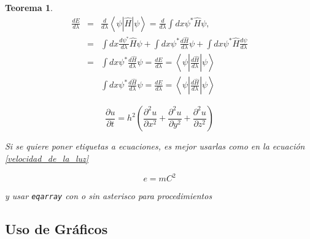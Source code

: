 \documentclass[a4paper]{IEEEtran} %
\newtheorem{teor}{Teorema}[section] %
\begin{document}
\begin{teor}
\begin{eqnarray*}
\frac{dE}{d \lambda}    & = & \frac{d}{d \lambda} \left\langle \psi | \widehat{H} | \psi \right\rangle = \frac{d}{d \lambda} \int dx \psi^* \widehat{H} \psi, \\
                        & = & \int dx \frac{d \psi^*}{d \lambda} \widehat{H} \psi + \int dx \psi^* \frac{d \widehat{H}}{d \lambda} \psi + \int dx \psi^* \widehat{H} \frac{d \psi}{d \lambda} \\
                        & = & \int dx \psi^* \frac{d \widehat{H}}{d \lambda} \psi = \frac{dE}{d \lambda} = \left\langle \psi \left| \frac{d \widehat{H}}{d \lambda} \right| \psi \right\rangle \\
                        && \int dx \psi^* \frac{d \widehat{H}}{d \lambda} \psi = \frac{dE}{d \lambda} = \left\langle \psi \left| \frac{d \widehat{H}}{d \lambda} \right| \psi \right\rangle %
\end{eqnarray*} %

\begin{equation}
\label{ecuacion_algo}
\frac{\partial u}{\partial t}
   = h^2 \left( \frac{\partial^2 u}{\partial x^2}
      + \frac{\partial^2 u}{\partial y^2}
      + \frac{\partial^2 u}{\partial z^2} \right)
\end{equation}

Si se quiere poner etiquetas a ecuaciones, es mejor usarlas como en la ecuación \eqref{velocidad_de_la_luz}

\begin{equation}
\label{velocidad_de_la_luz}
e = mC^2
\end{equation}

y usar \texttt{eqarray} con o sin asterisco para procedimientos
\end{teor}

\subsection{Uso de Gráficos}
\end{document}
